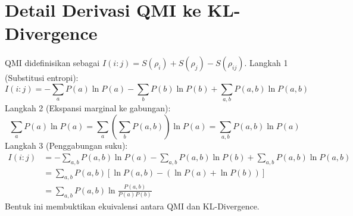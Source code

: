 \section{Detail Derivasi QMI ke KL-Divergence}
QMI didefinisikan sebagai $I(i:j) = S(\rho_i) + S(\rho_j) - S(\rho_{ij})$.
Langkah 1 (Substitusi entropi):
\begin{equation}
I(i:j) = -\sum_a P(a) \ln P(a) - \sum_b P(b) \ln P(b) + \sum_{a,b} P(a,b) \ln P(a,b)
\end{equation}
Langkah 2 (Ekspansi marginal ke gabungan):
\begin{equation}
\sum_a P(a) \ln P(a) = \sum_a \left(\sum_b P(a,b)\right) \ln P(a) = \sum_{a,b} P(a,b) \ln P(a)
\end{equation}
Langkah 3 (Penggabungan suku):
\begin{equation}
\begin{aligned}
I(i:j) &= -\sum_{a,b} P(a,b) \ln P(a) - \sum_{a,b} P(a,b) \ln P(b) + \sum_{a,b} P(a,b) \ln P(a,b) \\
&= \sum_{a,b} P(a,b) \left[ \ln P(a,b) - (\ln P(a) + \ln P(b)) \right] \\
&= \sum_{a,b} P(a,b) \ln \frac{P(a,b)}{P(a)P(b)}
\end{aligned}
\end{equation}
Bentuk ini membuktikan ekuivalensi antara QMI dan KL-Divergence.
